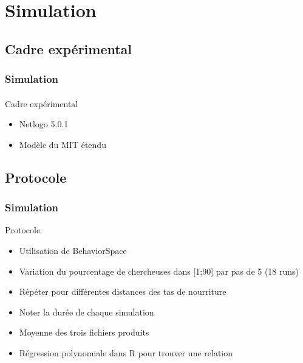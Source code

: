 \documentclass{beamer}
\begin{document}
\section{Simulation}
\subsection{Cadre expérimental}
\begin{frame}
\frametitle{Simulation}
\framesubtitle{}

\begin{block}{Cadre expérimental}
\begin{itemize}
\item Netlogo 5.0.1
\item Modèle du MIT étendu
\end{itemize}
\end{block}
\end{frame}


\subsection{Protocole}
\begin{frame}
\frametitle{Simulation}
\begin{block}{Protocole}
\begin{itemize}
\item Utilisation de BehaviorSpace
\item Variation du pourcentage de chercheuses dans [1;90] par pas de 5 (18 runs)
\item Répéter pour différentes distances des tas de nourriture
\item Noter la durée de chaque simulation
\item Moyenne des trois fichiers produits
\item Régression polynomiale dans R pour trouver une relation
\end{itemize}
\end{block}
\end{frame}
\end{document}
